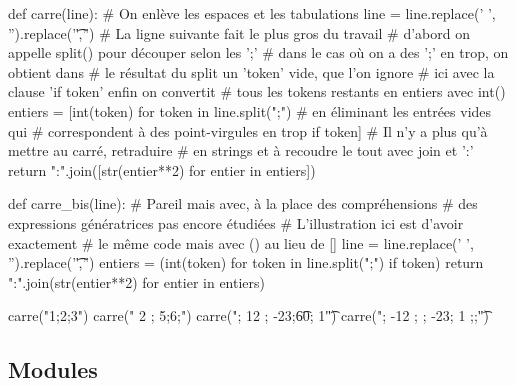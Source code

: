\begin{solution}
\vspace{-\baselineskip}
\begin{idleconsole}
\begin{pyconsole}
def carre(line):
    # On enlève les espaces et les tabulations
    line = line.replace(' ', '').replace('\t','')
    # La ligne suivante fait le plus gros du travail
    # d'abord on appelle split() pour découper selon les ';'
    # dans le cas où on a des ';' en trop, on obtient dans 
    # le résultat du split un 'token' vide, que l'on ignore 
    # ici avec la clause 'if token' enfin on convertit
    # tous les tokens restants en entiers avec int()
    entiers = [int(token) for token in line.split(";")
               # en éliminant les entrées vides qui
               # correspondent à des point-virgules en trop
               if token]
    # Il n'y a plus qu'à mettre au carré, retraduire
    # en strings et à recoudre le tout avec join et ':'
    return ":".join([str(entier**2) for entier in entiers])

def carre_bis(line):
    # Pareil mais avec, à la place des compréhensions
    # des expressions génératrices pas encore étudiées
    # L'illustration ici est d'avoir exactement
    # le même code mais avec () au lieu de []
    line = line.replace(' ', '').replace('\t','')
    entiers = (int(token) for token in line.split(";")
               if token)
    return ":".join(str(entier**2) for entier in entiers)

carre("1;2;3")
carre(" 2 ;  5;6;")
carre("; 12 ;  -23;\t60; 1\t")
carre("; -12 ; ; -23; 1 ;;\t")
\end{pyconsole}
\end{idleconsole}
\end{solution}


\subsection[Modules]{Modules}
\label{sub:XI.4.2}

